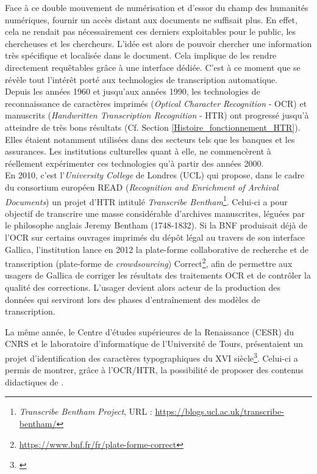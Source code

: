 Face à ce double mouvement de numérisation et d'essor du champ des humanités numériques, fournir un accès distant aux documents ne suffisait plus. En effet, cela ne rendait pas nécessairement ces derniers exploitables pour le public, les chercheuses et les chercheurs. L'idée est alors de pouvoir chercher une information très spécifique et localisée dans le document. Cela implique de les rendre directement requêtables grâce à une interface dédiée. C'est à ce moment que se révèle tout l'intérêt porté aux technologies de transcription automatique.\\ 

Depuis les années 1960 et jusqu'aux années 1990, les technologies de reconnaissance de caractères imprimés (\textit{Optical Character Recognition} - OCR) et manuscrits (\textit{Handwritten Transcription Recognition} - HTR) ont progressé jusqu'à atteindre de très bons résultats (Cf. Section \ref{Histoire_fonctionnement_HTR}). Elles étaient notamment utilisées dans des secteurs tels que les banques et les assurances. Les institutions culturelles quant à elle, ne commencèrent à réellement expérimenter ces technologies qu'à partir des années 2000.\\

En 2010, c'est l'\textit{University College} de Londres (UCL) qui propose, dans le cadre du consortium européen READ (\textit{Recognition and Enrichment of Archival Documents}) un projet d'HTR intitulé \textit{Transcribe Bentham}\footnote{\textit{Transcribe Bentham Project}, URL : \url{https://blogs.ucl.ac.uk/transcribe-bentham/}}. Celui-ci a pour objectif de transcrire une masse considérable d'archives manuscrites, léguées par le philosophe anglais Jeremy Bentham (1748-1832). Si la BNF produisait déjà de l'OCR sur certains ouvrages imprimés du dépôt légal au travers de son interface Gallica, l'institution lance en 2012 la plate-forme collaborative de recherche et de transcription (plate-forme de \textit{crowdsourcing}) Correct\footnote{\url{https://www.bnf.fr/fr/plate-forme-correct}}, afin de permettre aux usagers de Gallica de corriger les résultats des traitements OCR et de contrôler la qualité des corrections.
L'usager devient alors acteur de la production des données qui serviront lors des phases d'entraînement des modèles de transcription.

La même année, le Centre d'études supérieures de la Renaissance (CESR) du CNRS et le laboratoire d'informatique de l'Université de Tours, présentaient un projet d'identification des caractères typographiques du XVI siècle\footnote{\cite{rayar_exploiting_2012}}. Celui-ci a permis de montrer, grâce à l'OCR/HTR, la possibilité de proposer des contenus didactiques de . 

